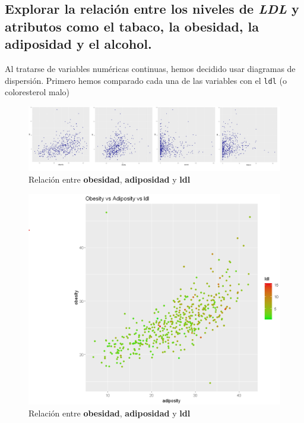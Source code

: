 \documentclass[a4paper, 9pt]{article}
\begin{document}
\subsection{Explorar la relación entre los niveles de \textit{LDL} y atributos como el tabaco, la obesidad, la adiposidad y el alcohol.} \label{sssec:ldltobaccoalcoholobesityadiposity}

\vspace{3mm}

Al tratarse de variables numéricas continuas, hemos decidido usar
diagramas de dispersión. Primero hemos comparado cada una de las variables con el \texttt{ldl} (o
coloresterol malo)

\begin{figure}[ht]
    \centering
    \includegraphics[scale=0.20]{images/question-3/ldlvsvariables.png}
    \caption{Relación entre \textbf{obesidad}, \textbf{adiposidad} y \textbf{ldl}}
    \label{fig:scatteralcoholtobacco}
\end{figure}

\begin{figure}
    \centering
    \includegraphics[scale=0.36]{images/question-3/obsityvsadiposityvsldl.png}
    \caption{Relación entre \textbf{obesidad}, \textbf{adiposidad} y \textbf{ldl}}
    \label{fig:obsityvsadiposityvsldl}
\end{figure}
\end{document}
